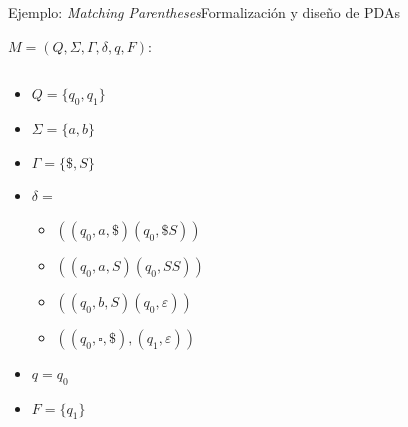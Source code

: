\documentclass[spanish]{beamer}
\begin{document}
\begin{frame}{Ejemplo: \textit{Matching Parentheses}}{Formalización y diseño de PDAs}

    $M = (Q, \Sigma, \Gamma, \delta, q, F)$:

    \begin{columns}
        \begin{column}{0.4\textwidth}
            \begin{itemize}
                \item $Q = \{q_0, q_1\}$
                \item $\Sigma = \{a,b\}$
                \item $\Gamma = \{\$, S\}$
                \item $\delta =$
                \begin{itemize}
                    \item $((q_0,a,\$)(q_0,\$S))$
                    \item $((q_0,a,S)(q_0,SS))$
                    \item $((q_0,b,S)(q_0,\varepsilon))$
                    \item $((q_0,\square,\$),(q_1,\varepsilon))$
                \end{itemize}
                \item $q = q_0$
                \item $F = \{q_1\}$
            \end{itemize}
        \end{column}
        \begin{column}{0.6\textwidth}
        \end{column}
    \end{columns}
    
\end{frame}
\end{document}
